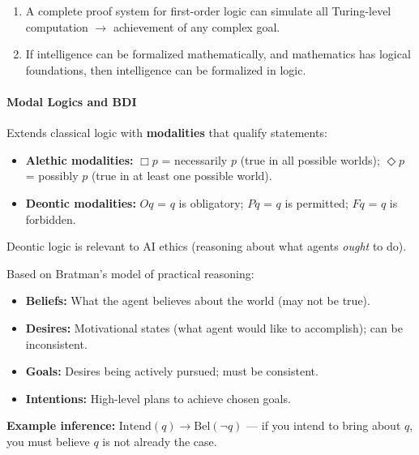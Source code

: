 \begin{thmbox}
\begin{enumerate}
  \item A complete proof system for first-order logic can simulate all Turing-level computation $\to$ achievement of any complex goal.
  \item If intelligence can be formalized mathematically, and mathematics has logical foundations, then intelligence can be formalized in logic.
\end{enumerate}
\end{thmbox}

\separator

\paragraph*{Modal Logics and BDI}

\begin{defbox}
Extends classical logic with \textbf{modalities} that qualify statements:
\begin{itemize}
  \item \textbf{Alethic modalities:} $\Box p$ = necessarily $p$ (true in all possible worlds); $\Diamond p$ = possibly $p$ (true in at least one possible world).
  \item \textbf{Deontic modalities:} $Oq$ = $q$ is obligatory; $Pq$ = $q$ is permitted; $Fq$ = $q$ is forbidden.
\end{itemize}
Deontic logic is relevant to AI ethics (reasoning about what agents \textit{ought} to do).
\end{defbox}

\begin{defbox}
Based on Bratman's model of practical reasoning:
\begin{itemize}
  \item \textbf{Beliefs:} What the agent believes about the world (may not be true).
  \item \textbf{Desires:} Motivational states (what agent would like to accomplish); can be inconsistent.
  \item \textbf{Goals:} Desires being actively pursued; must be consistent.
  \item \textbf{Intentions:} High-level plans to achieve chosen goals.
\end{itemize}

\textbf{Example inference:} $\text{Intend}(q) \to \text{Bel}(\neg q)$ --- if you intend to bring about $q$, you must believe $q$ is not already the case.
\end{defbox}

